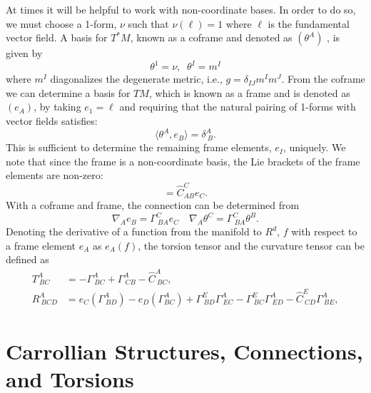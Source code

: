 \documentclass{article}
\newcommand{\ai}{A}
\newcommand{\bb}{B}
\newcommand{\cc}{C}
\newcommand{\dd}{D}
\newcommand{\eee}{E}
\newcommand{\ii}{I}
\newcommand{\jj}{J}
\theoremstyle{definition}
\theoremstyle{remark}
\begin{document}
At times it will be helpful to work with non-coordinate bases. In order to do so, we must choose a 1-form, $\nu$ such that $\nu(\ell) = 1$ where $\ell$ is the fundamental vector field.  A basis for $T^*M$, known as a coframe and denoted as $(\theta^\ai)$ , is given by
\begin{equation}
    \theta^1 = \nu, \;\;\theta^{\ii} = m^{\ii}
\end{equation}
\noindent where $m^\ii$ diagonalizes the degenerate metric, i.e., $g = \delta_{\ii\jj} m^\ii m^\jj$. From the coframe we can determine a basis for $TM$, which is known as a frame and is denoted as $(e_\ai)$, by taking $e_1 = \ell$ and requiring that the natural pairing of 1-forms with vector fields satisfies: 
\begin{equation}
    \langle \theta^\ai, e_\bb \rangle = \delta^\ai_{~\bb}. 
\end{equation}
\noindent This is sufficient to determine the remaining frame elements, $e_\ii$, uniquely. We note that since the frame is a non-coordinate basis, the Lie brackets of the frame elements are non-zero:
\begin{equation}
    [e_\ai, e_\bb] = \hat{C}^\cc_{\ai \bb} e_\cc.     
\end{equation} 
With a coframe and frame, the connection can be determined from 
\begin{equation}
    \nabla_\ai e_\bb = \Gamma^\cc_{~\bb \ai} e_\cc \quad \nabla_\ai \theta^\cc = \Gamma^\cc_{~\bb \ai} \theta^\bb. 
\end{equation}
\noindent Denoting the derivative of a function from the manifold to $R^{d}$, $f$ with respect to a frame element $e_A$ as $e_A(f)$, the torsion tensor and the curvature tensor can be defined as 
   \begin{equation}
        \begin{aligned}
            T^\ai_{~\bb\cc} &= -\Gamma^\ai_{~\bb \cc} + \Gamma^\ai_{~\cc \bb} - \hat{C}^\ai_{~\bb \cc}, \\
            R^\ai_{~\bb \cc \dd} &= e_\cc(\Gamma^\ai_{~\bb \dd}) - e_\dd(\Gamma^\ai_{\bb \cc}) + \Gamma^\eee_{~\bb\dd} \Gamma^\ai_{~\eee\cc} - \Gamma^\eee_{~\bb\cc} \Gamma^\ai_{~\eee\dd} - \hat{C}^\eee_{~\cc\dd} \Gamma^A_{~\bb \eee},
        \end{aligned} \label{eqn:GeomTensors}
    \end{equation}

\section{Carrollian Structures, Connections, and Torsions} \label{sec:carollian}
\end{document}

